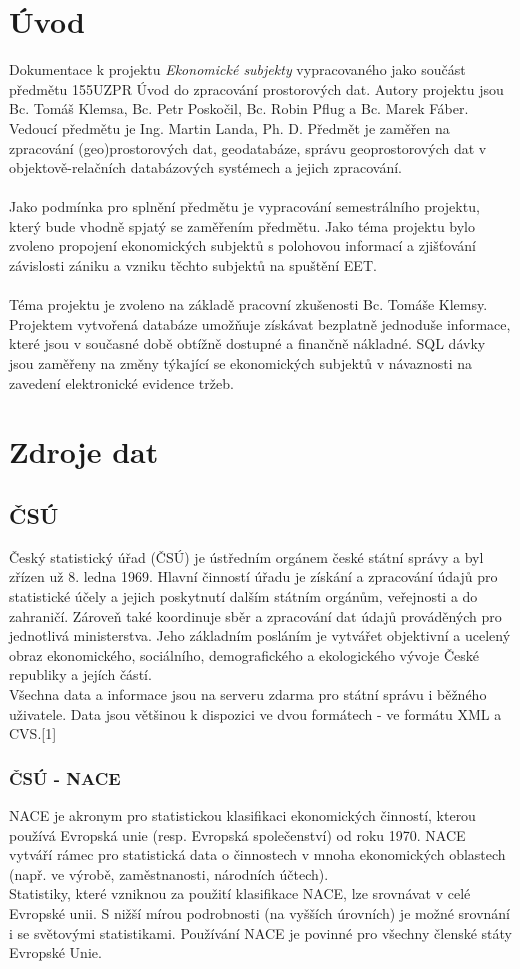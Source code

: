 \documentclass[a4paper, 12pt]{article}
\begin{document}
\section{Úvod}
Dokumentace k projektu \textit{Ekonomické subjekty} vypracovaného jako součást předmětu 155UZPR Úvod do zpracování prostorových dat. Autory projektu jsou Bc. Tomáš Klemsa, Bc. Petr Poskočil, Bc. Robin Pflug a Bc. Marek Fáber. Vedoucí předmětu je Ing. Martin Landa, Ph. D. Předmět je zaměřen na zpracování (geo)prostorových dat, geodatabáze, správu geoprostorových dat v objektově-relačních databázových systémech a jejich zpracování.\\
\\
Jako podmínka pro splnění předmětu je vypracování semestrálního projektu, který bude vhodně spjatý se zaměřením předmětu. Jako téma projektu bylo zvoleno propojení ekonomických subjektů s polohovou informací a zjišťování závislosti zániku a vzniku těchto subjektů na spuštění EET.\\
\\
Téma projektu je zvoleno na základě pracovní zkušenosti Bc. Tomáše Klemsy. Projektem vytvořená databáze umožňuje získávat bezplatně jednoduše informace, které jsou v současné době obtížně dostupné a finančně nákladné. SQL dávky jsou zaměřeny na změny týkající se ekonomických subjektů v návaznosti na zavedení elektronické evidence tržeb. 

\section{Zdroje dat}

\subsection{ČSÚ}
Český statistický úřad (ČSÚ) je ústředním orgánem české státní správy a byl zřízen už 8. ledna 1969. Hlavní činností úřadu je získání a zpracování údajů pro statistické účely a jejich poskytnutí dalším státním orgánům, veřejnosti a do zahraničí. Zároveň také koordinuje sběr a zpracování dat údajů prováděných pro jednotlivá ministerstva. Jeho základním posláním je vytvářet objektivní a ucelený obraz ekonomického, sociálního, demografického a ekologického vývoje České republiky a jejích částí.\\
Všechna data a informace jsou na serveru zdarma pro státní správu i běžného uživatele. Data jsou většinou k dispozici ve dvou formátech - ve formátu XML a CVS.[1]

\subsubsection{ČSÚ - NACE}
NACE je akronym pro statistickou klasifikaci ekonomických činností, kterou používá Evropská unie (resp. Evropská společenství) od roku 1970. NACE vytváří rámec pro statistická data o činnostech v mnoha ekonomických oblastech (např. ve výrobě, zaměstnanosti, národních účtech).\\
Statistiky, které vzniknou za použití klasifikace NACE, lze srovnávat v celé Evropské unii. S nižší mírou podrobnosti (na vyšších úrovních) je možné srovnání i se světovými statistikami. Používání NACE je povinné pro všechny členské státy Evropské Unie. 
\end{document}
